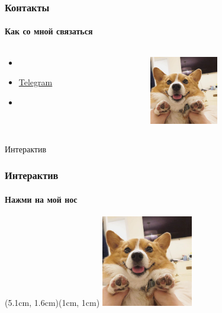 \documentclass[compress, red]{beamer}
\begin{document}
\begin{frame}
\frametitle{Контакты}
\framesubtitle{Как со мной связаться}
\begin{columns}[T] 
    \begin{column}{5cm} 
    \begin{itemize}
    \item<1-> 
    \item<2-> \href{https://t.me/at_one_day}{Telegram}
    \item<3-> 
    \end{itemize}
    \end{column}
    \begin{column}{5cm} 
        \centering
        \includegraphics[height=3cm]{images/корги.jpg}
    \end{column}
\end{columns}
\end{frame}

\begin{frame}{Интерактив}
\frametitle{Интерактив}
\framesubtitle{Нажми на мой нос}
(5.1cm, 1.6cm)(1cm, 1cm) 
\centering
\includegraphics[height=4cm]{images/корги.jpg}
    
\end{frame}
\end{document}
